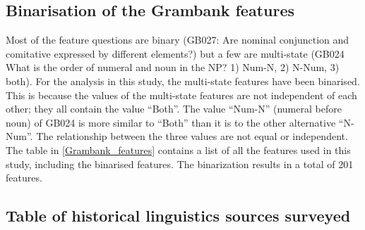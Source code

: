 \documentclass[12pt,letterpaper]{article}
\begin{document}



\FloatBarrier

\subsection{Binarisation of the Grambank features}
\label{supp:dataset_details}
Most of the feature questions are binary (GB027: Are nominal conjunction and comitative expressed by different elements?) but a few are multi-state (GB024 What is the order of numeral and noun in the NP? 1) Num-N, 2) N-Num, 3) both). For the analysis in this study, the multi-state features have been binarised. This is because the values of the multi-state features are not independent of each other; they all contain the value ``Both''. The value ``Num-N'' (numeral before noun) of GB024 is more similar to ``Both'' than it is to the other alternative ``N-Num''. The relationship between the three values are not equal or independent. The table in \ref{Grambank_features} contains a list of all the features used in this study, including the binarised features. The binarization results in a total of 201 features. 

\FloatBarrier

\subsection{Table of historical linguistics sources surveyed}
\label{supp:proto_lg_coding_table}
\end{document}
